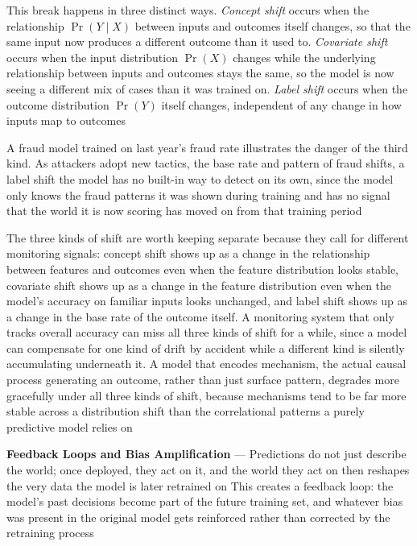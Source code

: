 This break happens in three distinct ways. \emph{Concept shift} occurs when the
relationship $\Pr(Y \mid X)$ between inputs and outcomes itself changes, so that
the same input now produces a different outcome than it used to. \emph{Covariate
shift} occurs when the input distribution $\Pr(X)$ changes while the underlying relationship
between inputs and outcomes stays the same, so the model is now seeing a
different mix of cases than it was trained on. \emph{Label shift} occurs when
the outcome distribution $\Pr(Y)$ itself changes, independent of any change in how
inputs map to outcomes

A fraud model trained on last year's fraud rate illustrates the danger of the
third kind. As attackers adopt new tactics, the base rate and pattern of fraud
shifts, a label shift the model has no built-in way to detect on its own, since
the model only knows the fraud patterns it was shown during training and has no
signal that the world it is now scoring has moved on from that training period

The three kinds of shift are worth keeping separate because they call for different
monitoring signals: concept shift shows up as a change in the relationship
between features and outcomes even when the feature distribution looks stable, covariate
shift shows up as a change in the feature distribution even when the model's accuracy
on familiar inputs looks unchanged, and label shift shows up as a change in the
base rate of the outcome itself. A monitoring system that only tracks overall accuracy
can miss all three kinds of shift for a while, since a model can compensate for
one kind of drift by accident while a different kind is silently accumulating
underneath it. A model that encodes mechanism, the actual causal process
generating an outcome, rather than just surface pattern, degrades more
gracefully under all three kinds of shift, because mechanisms tend to be far more
stable across a distribution shift than the correlational patterns a purely predictive
model relies on

\textbf{Feedback Loops and Bias Amplification} --- Predictions do not just describe
the world; once deployed, they act on it, and the world they act on then
reshapes the very data the model is later retrained on This creates a feedback
loop: the model's past decisions become part of the future training set, and
whatever bias was present in the original model gets reinforced rather than
corrected by the retraining process

